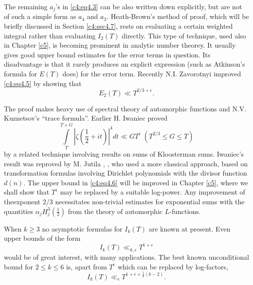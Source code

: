 The remaining $a_j$'s in \eqref{c4:eq4.3} can be also written down
explicitly, but are not of such a simple form as $a_4$ and
$a_3$. Heath-Brown's method of proof, which will be briefly discussed
in Section \ref{c4:sec4.7}, rests on evaluating a certain weighted
integral rather than evaluating $I_2 (T)$ directly. This type of
technique, used also in Chapter \ref{c5}, is becoming prominent in analytic
number theorey. It usually gives good upper bound estimates for the
error terms in question. Its disadvantage is that it rarely produces
an explicit expression (such as Atkinson's formula for $E(T)$ does)
for the error term. Recently N.I. Zavorotnyi improved \eqref{c4:eq4.5}
by showing that
\begin{equation}
  E_2 (T) \ll T^{2/3+\epsilon}. \label{c4:eq4.6}
\end{equation}

The proof makes heavy use of spectral theory of automorphic functions
and N.V. Kuznetsov's ``trace formula''. Earlier H. Iwaniec \cite{Iwaniec1}
proved 
$$
\int\limits_T^{T+G} \left|\zeta \left(\frac{1}{2} + it
\right)\right|^4 dt \ll  GT^\epsilon \;  \left(T^{2/3} \leq G\leq T\right)
$$ 
by a related technique involving results on sums of Kloosterman
sums. Iwaniec's result was reproved by M. Jutila \cite{Jutila10}, \cite{Jutila11},
who used a more classical approach, based on transformation formulas
involving Dirichlet polynomials with the divisor function $d(n)$. The
upper bound in \eqref{c4:eq4.6} will be improved in Chapter \ref{c5}, where
we shall show that $T^\epsilon$ may be replaced by a suitable
log-power. Any improvement of the\pageoriginale exponent $2/3$
necessitates non-trivial estimates for exponential sums with the
quantities $\alpha_j H^3_j (\frac{1}{2})$ from the theory of
automorphic $L$-functions.

When $k \geq 3$ no asymptotic formulas for $I_k (T)$ are known at
present. Even upper bounds of the form
$$
I_k (T) \ll _{k, \epsilon} T^{1+\epsilon}
$$
would be of great interest, with many applications. The best known
unconditional bound for $2 \leq k \leq 6$ is, apart from $T^\epsilon$
which can be replaced by log-factors,
\begin{equation}
  I_k(T) \ll_\epsilon T^{1+ \epsilon + \frac{1}{4} (k-2)}. \label{c4:eq4.7}
\end{equation}

